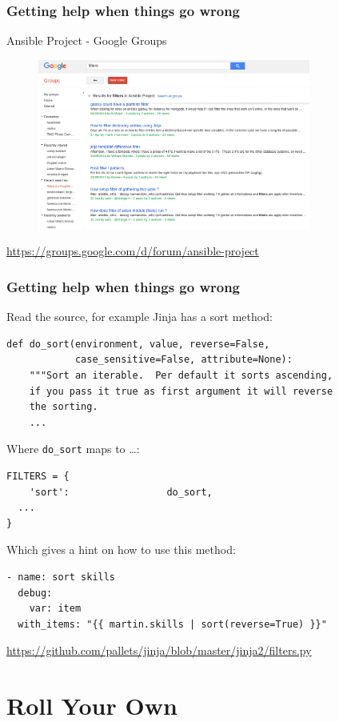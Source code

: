 \documentclass[pdf]{beamer}
\begin{document}
\begin{frame}[fragile]
  \frametitle{Getting help when things go wrong}
  Ansible Project - Google Groups
  \begin{center}
    \begin{figure}
      \includegraphics[width=0.8\textwidth]{ansible-google-group.png}
    \end{figure}
  \end{center}
  \tiny \url{https://groups.google.com/d/forum/ansible-project}
\end{frame}

\begin{frame}[t,fragile]
  \frametitle{Getting help when things go wrong}
  Read the source, for example Jinja has a sort method:
  \begin{lstlisting}
def do_sort(environment, value, reverse=False,
            case_sensitive=False, attribute=None):
    """Sort an iterable.  Per default it sorts ascending,
    if you pass it true as first argument it will reverse
    the sorting.
    ...
  \end{lstlisting}
  \pause{}
  Where {\color{blue}\texttt{do\_sort}} maps to \ldots {}:
  \begin{lstlisting}
FILTERS = {
    'sort':                 do_sort,
  ...
}
  \end{lstlisting}
  \pause{}
  Which gives a hint on how to use this method:
  \begin{lstlisting}
- name: sort skills
  debug:
    var: item
  with_items: "{{ martin.skills | sort(reverse=True) }}"
  \end{lstlisting}
  \tiny \url{https://github.com/pallets/jinja/blob/master/jinja2/filters.py}
\end{frame}

\section{Roll Your Own}
\end{document}
